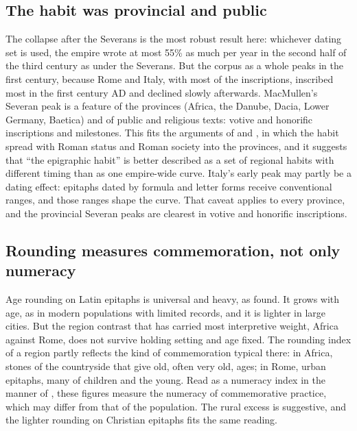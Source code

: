 \documentclass[11pt,a4paper]{article}
\begin{document}
\subsection{The habit was provincial and public}
The collapse after the Severans is the most robust result here: whichever dating set is used, the empire wrote at most 55\% as much per year in the second half of the third century as under the Severans. But the corpus as a whole peaks in the first century, because Rome and Italy, with most of the inscriptions, inscribed most in the first century AD and declined slowly afterwards. MacMullen's Severan peak is a feature of the provinces (Africa, the Danube, Dacia, Lower Germany, Baetica) and of public and religious texts: votive and honorific inscriptions and milestones. This fits the arguments of \citet{meyer1990} and \citet{woolf1996}, in which the habit spread with Roman status and Roman society into the provinces, and it suggests that ``the epigraphic habit'' is better described as a set of regional habits with different timing than as one empire-wide curve. Italy's early peak may partly be a dating effect: epitaphs dated by formula and letter forms receive conventional ranges, and those ranges shape the curve. That caveat applies to every province, and the provincial Severan peaks are clearest in votive and honorific inscriptions.

\subsection{Rounding measures commemoration, not only numeracy}
Age rounding on Latin epitaphs is universal and heavy, as \citet{duncanjones1977} found. It grows with age, as in modern populations with limited records, and it is lighter in large cities. But the region contrast that has carried most interpretive weight, Africa against Rome, does not survive holding setting and age fixed. The rounding index of a region partly reflects the kind of commemoration typical there: in Africa, stones of the countryside that give old, often very old, ages; in Rome, urban epitaphs, many of children and the young. Read as a numeracy index in the manner of \citet{ahearn2009}, these figures measure the numeracy of commemorative practice, which may differ from that of the population. The rural excess is suggestive, and the lighter rounding on Christian epitaphs fits the same reading.
\end{document}
